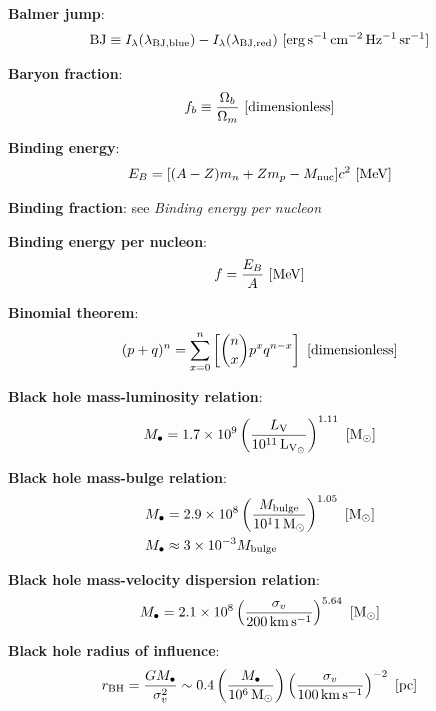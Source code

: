 \documentclass[a4paper,10pt]{article}
\begin{document}
{\noindent}\textbf{Balmer jump}:
\begin{align*}
    {\rm BJ}\equiv I_\lambda(\lambda_{\rm BJ,blue}) - I_\lambda(\lambda_{\rm BJ,red}) ~ [{\rm erg\,s^{-1}\,cm^{-2}\,Hz^{-1}\,sr^{-1}}]
\end{align*}

{\noindent}\textbf{Baryon fraction}:
\begin{align*}
    f_b \equiv \frac{\Omega_b}{\Omega_m} ~ [{\rm dimensionless}]
\end{align*}

{\noindent}\textbf{Binding energy}:
\begin{align*}
    E_B = [(A-Z)m_n+Zm_p-M_{\rm nuc}]c^2  ~ [{\rm MeV}]
\end{align*}

{\noindent}\textbf{Binding fraction}: see \textit{Binding energy per nucleon}

{\noindent}\textbf{Binding energy per nucleon}:
\begin{align*}
    f = \frac{E_B}{A} ~ [{\rm MeV}]
\end{align*}

{\noindent}\textbf{Binomial theorem}:
\begin{align*}
    (p+q)^n = \sum _{x=0}^n \left[ \binom{n}{x}p^xq^{n-x} \right] ~ [{\rm dimensionless}]
\end{align*}

{\noindent}\textbf{Black hole mass-luminosity relation}:
\begin{align*}
    M_\bullet = 1.7\times10^9\left(\frac{L_\mathrm{V}}{10^{11}\,{\rm L_{V_\odot}}}\right)^{1.11} ~ [{\rm M_\odot}]
\end{align*}

{\noindent}\textbf{Black hole mass-bulge relation}:
\begin{align*}
    M_\bullet &= 2.9\times10^8\left(\frac{M_\mathrm{bulge}}{10^11\,{\rm M_\odot}}\right)^{1.05} ~ [{\rm M_\odot}] \\
    M_\bullet &\approx 3\times10^{-3}M_\mathrm{bulge}
\end{align*}

{\noindent}\textbf{Black hole mass-velocity dispersion relation}:
\begin{align*}
    M_\bullet = 2.1\times 10^8\left(\frac{\sigma_v}{200\,{\rm km\,s^{-1}}}\right)^{5.64} ~ [{\rm M_\odot}]
\end{align*}

{\noindent}\textbf{Black hole radius of influence}:
\begin{align*}
    r_\mathrm{BH} = \frac{GM_\bullet}{\sigma_v^2} \sim 0.4\left(\frac{M_\bullet}{10^6\,{\rm M_\odot}}\right)\left(\frac{\sigma_v}{100\,{\rm km\,s^{-1}}}\right)^{-2} ~ [{\rm pc}]
\end{align*}
\end{document}
